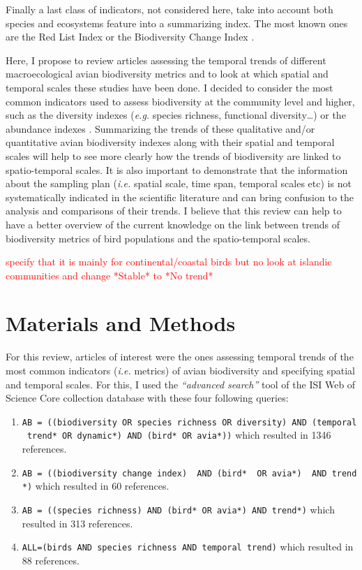 \documentclass[
  12pt,
  oneside]{report}
\begin{document}
Finally a last class of indicators, not considered here, take into account both species and ecosystems feature into a summarizing index. The most known ones are the Red List Index \autocite{butchart_improvements_2007,butchart_using_2005,butchart_measuring_2004} or the Biodiversity Change Index \autocite{normander_indicator_2012}.

Here, I propose to review articles assessing the temporal trends of different macroecological avian biodiversity metrics and to look at which spatial and temporal scales these studies have been done. I decided to consider the most common indicators used to assess biodiversity at the community level and higher, such as the diversity indexes (\emph{e.g.} species richness, functional diversity\ldots) or the abundance indexes \autocite{mcgill_fifteen_2015}. Summarizing the trends of these qualitative and/or quantitative avian biodiversity indexes along with their spatial and temporal scales will help to see more clearly how the trends of biodiversity are linked to spatio-temporal scales. It is also important to demonstrate that the information about the sampling plan (\emph{i.e.} spatial scale, time span, temporal scales etc) is not systematically indicated in the scientific literature and can bring confusion to the analysis and comparisons of their trends. I believe that this review can help to have a better overview of the current knowledge on the link between trends of biodiversity metrics of bird populations and the spatio-temporal scales.

\textcolor{red}{specify that it is mainly for continental/coastal birds but no look at  islandic communities and change *Stable* to *No trend*}

\hypertarget{materials-and-methods}{%
\chapter{Materials and Methods}\label{materials-and-methods}}

For this review, articles of interest were the ones assessing temporal trends of the most common indicators (\emph{i.e.} metrics) of avian biodiversity and specifying spatial and temporal scales. For this, I used the \emph{``advanced search''} tool of the ISI Web of Science Core collection database with these four following queries:

\begin{enumerate}
\def\labelenumi{\arabic{enumi}.}
\item
  \texttt{AB\ =\ ((biodiversity\ OR\ species\ richness\ OR\ diversity)\ AND\ (temporal\ trend*\ OR\ dynamic*)\ AND\ (bird*\ OR\ avia*))} which resulted in 1346 references.
\item
  \texttt{AB\ =\ ((biodiversity\ change\ index)\ \ AND\ (bird*\ \ OR\ avia*)\ \ AND\ trend*)} which resulted in 60 references.
\item
  \texttt{AB\ =\ ((species\ richness)\ AND\ (bird*\ OR\ avia*)\ AND\ trend*)} which resulted in 313 references.
\item
  \texttt{ALL=(birds\ AND\ species\ richness\ AND\ temporal\ trend)} which resulted in 88 references.
\end{enumerate}
\end{document}
